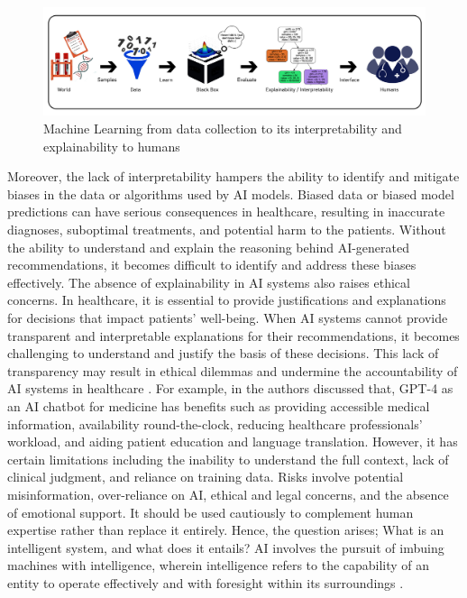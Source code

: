 \documentclass{article}
\begin{document}
\begin{figure}
\centering
\includegraphics[width=1\linewidth]{Fig1.1.jpg}
\caption{\label{fig:1.1}Machine Learning from data collection to its interpretability and explainability to humans}
\end{figure}

Moreover, the lack of interpretability hampers the ability to identify and mitigate biases in the data or algorithms used by AI models. Biased data or biased model predictions can have serious consequences in healthcare, resulting in inaccurate diagnoses, suboptimal treatments, and potential harm to the patients. Without the ability to understand and explain the reasoning behind AI-generated recommendations, it becomes difficult to identify and address these biases effectively. The absence of explainability in AI systems also raises ethical concerns. In healthcare, it is essential to provide justifications and explanations for decisions that impact patients' well-being. When AI systems cannot provide transparent and interpretable explanations for their recommendations, it becomes challenging to understand and justify the basis of these decisions. This lack of transparency may result in ethical dilemmas and undermine the accountability of AI systems in healthcare \cite{vandewiele2016genesim}. For example, in \cite{lee2023benefits} the authors discussed that, 
GPT-4 as an AI chatbot for medicine has benefits such as providing accessible medical information, availability round-the-clock, reducing healthcare professionals' workload, and aiding patient education and language translation. However, it has certain limitations including the inability to understand the full context, lack of clinical judgment, and reliance on training data. Risks involve potential misinformation, over-reliance on AI, ethical and legal concerns, and the absence of emotional support. It should be used cautiously to complement human expertise rather than replace it entirely. Hence, the question arises; What is an intelligent system, and what does it entails? AI involves the pursuit of imbuing machines with intelligence, wherein intelligence refers to the capability of an entity to operate effectively and with foresight within its surroundings \cite{nilsson2009quest}.
\end{document}
